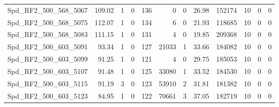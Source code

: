 \begin{longtable}[c]{@{}lrrrrrrrrrrr@{}}
Spd\_RF2\_500\_568\_5067      & 109.02                 & 1                       & 0                       & 136                    & 0                       & 0                       & 26.98                   & 152174                   & 10                       & 0                        & 0                        \\
Spd\_RF2\_500\_568\_5075      & 112.07                 & 1                       & 0                       & 134                    & 6                       & 0                       & 21.93                   & 118685                   & 10                       & 0                        & 0                        \\
Spd\_RF2\_500\_568\_5083      & 111.15                 & 1                       & 0                       & 131                    & 4                       & 0                       & 19.85                   & 209368                   & 10                       & 0                        & 0                        \\
Spd\_RF2\_500\_603\_5091      & 93.34                  & 1                       & 0                       & 127                    & 21033                   & 1                       & 33.66                   & 184082                   & 10                       & 0                        & 0                        \\
Spd\_RF2\_500\_603\_5099      & 91.25                  & 1                       & 0                       & 121                    & 4                       & 0                       & 29.75                   & 185053                   & 10                       & 0                        & 0                        \\
Spd\_RF2\_500\_603\_5107      & 91.48                  & 1                       & 0                       & 125                    & 33080                   & 1                       & 33.52                   & 184530                   & 10                       & 0                        & 0                        \\
Spd\_RF2\_500\_603\_5115      & 91.19                  & 3                       & 0                       & 123                    & 53910                   & 2                       & 31.81                   & 181382                   & 10                       & 0                        & 0                        \\
Spd\_RF2\_500\_603\_5123      & 84.95                  & 1                       & 0                       & 122                    & 70661                   & 3                       & 37.05                   & 182719                   & 10                       & 0                        & 0                        \\

\end{longtable}
